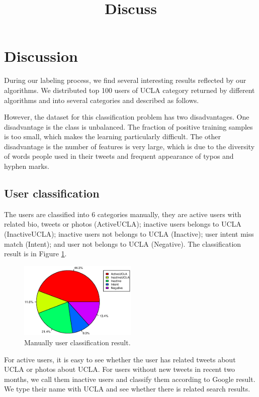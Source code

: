 \documentclass{article}
\begin{document}
\title{Discuss}
\maketitle \else \fi

\section{Discussion}\label{sec:discussion}
During our labeling process, we find several interesting results reflected by our algorithms. We distributed top 100 users of UCLA category returned by different algorithms and into several categories and described as follows.


However, the dataset for this classification problem has two disadvantages. One disadvantage is the class is unbalanced. The fraction of positive training samples is too small, which makes the learning particularly difficult. The other disadvantage is the number of features is very large, which is due to the diversity of words people used in their tweets and frequent appearance of typos and hyphen marks.


\subsection{User classification}
The users are classified into $6$ categories manually, they are active users with related bio, tweets or photos (ActiveUCLA); inactive users belongs to UCLA (InactiveUCLA); inactive users not belongs to UCLA (Inactive); user intent miss match (Intent); and user not belongs to UCLA (Negative). The classification result is in Figure \ref{fig:userclass}.

\begin{figure}[h]
\centering
\includegraphics[width=0.5\textwidth]{experiment/uc.eps}
\caption{Manually user classification result.}
\label{fig:userclass}
\end{figure}

For active users, it is easy to see whether the user has related tweets about UCLA or photos about UCLA. For users without new tweets in recent two months, we call them inactive users and classify them according to Google result. We type their name with UCLA and see whether there is related search results.
\end{document}
